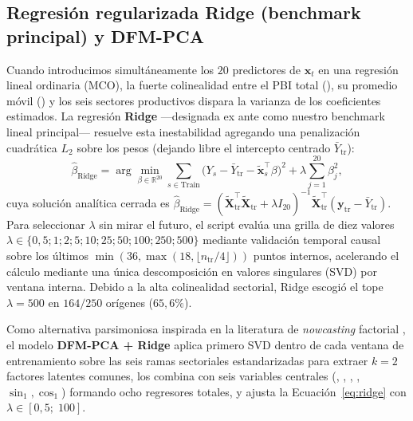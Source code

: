\documentclass[12pt,letterpaper]{article}
\begin{document}
\subsection{Regresión regularizada Ridge (benchmark principal) y DFM-PCA}

Cuando introducimos simultáneamente los \(20\) predictores de \(\mathbf{x}_t\) en una regresión lineal ordinaria (MCO), la fuerte colinealidad entre el PBI total (), su promedio móvil () y los seis sectores productivos dispara la varianza de los coeficientes estimados. La regresión \textbf{Ridge} \parencite{hoerl1970} —designada ex ante como nuestro benchmark lineal principal— resuelve esta inestabilidad agregando una penalización cuadrática \(L_2\) sobre los pesos (dejando libre el intercepto centrado \(\bar{Y}_{\text{tr}}\)):
\begin{equation}
  \hat{\beta}_{\text{Ridge}} = \arg\min_{\beta \in \mathbb{R}^{20}} \sum_{s \in \text{Train}} \bigl(Y_s - \bar{Y}_{\text{tr}} - \tilde{\mathbf{x}}_s^{\top}\beta\bigr)^2 + \lambda \sum_{j=1}^{20} \beta_j^2,
  \label{eq:ridge}
\end{equation}
cuya solución analítica cerrada es \(\hat{\beta}_{\text{Ridge}} = (\tilde{\mathbf{X}}_{\text{tr}}^{\top}\tilde{\mathbf{X}}_{\text{tr}} + \lambda I_{20})^{-1} \tilde{\mathbf{X}}_{\text{tr}}^{\top}(\mathbf{y}_{\text{tr}} - \bar{Y}_{\text{tr}})\). Para seleccionar \(\lambda\) sin mirar el futuro, el script  evalúa una grilla de diez valores \(\lambda \in \{0{,}5; 1; 2; 5; 10; 25; 50; 100; 250; 500\}\) mediante validación temporal causal sobre los últimos \(\min(36, \max(18, \lfloor n_{\text{tr}}/4\rfloor))\) puntos internos, acelerando el cálculo mediante una única descomposición en valores singulares (SVD) por ventana interna. Debido a la alta colinealidad sectorial, Ridge escogió el tope \(\lambda = 500\) en \(164/250\) orígenes (\(65{,}6\%\)).

Como alternativa parsimoniosa inspirada en la literatura de \emph{nowcasting} factorial \parencite{stock2002, giannone2008, banbura2011}, el modelo \textbf{DFM-PCA + Ridge} aplica primero SVD dentro de cada ventana de entrenamiento sobre las seis ramas sectoriales estandarizadas para extraer \(k = 2\) factores latentes comunes, los combina con seis variables centrales (, , , , \(\sin_1, \cos_1\)) formando ocho regresores totales, y ajusta la Ecuación~\ref{eq:ridge} con \(\lambda \in [0{,}5;\; 100]\).
\end{document}
